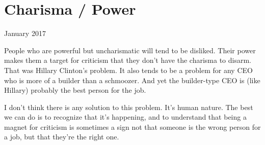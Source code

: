 \chapter{Charisma / Power}

January 2017

People who are powerful but uncharismatic will tend to be disliked.
Their power makes them a target for criticism that they don't have the
charisma to disarm. That was Hillary Clinton's problem. It also tends to
be a problem for any CEO who is more of a builder than a schmoozer. And
yet the builder-type CEO is (like Hillary) probably the best person for
the job.

I don't think there is any solution to this problem. It's human nature.
The best we can do is to recognize that it's happening, and to
understand that being a magnet for criticism is sometimes a sign not
that someone is the wrong person for a job, but that they're the right
one.